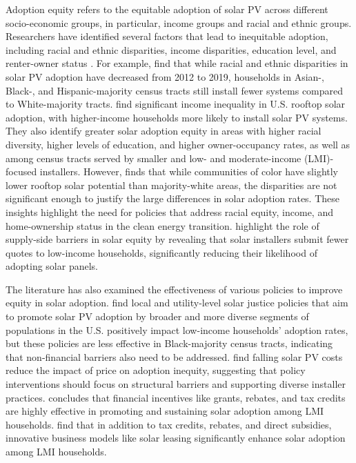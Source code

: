 \documentclass[12pt,twoside,letterpaper]{article}
\begin{document}
 Adoption equity refers to the equitable adoption of solar PV across different socio-economic groups, in particular, income groups and racial and ethnic groups. Researchers have identified several factors that lead to inequitable adoption, including racial and ethnic disparities, income disparities, education level, and renter-owner status \parencite{gao_solar_2022, darghouth_characterizing_2022, lukanov_distributed_2019, best_meta-analysis_2023}. For example, \textcite{gao_solar_2022} find that while racial and ethnic disparities in solar PV adoption have decreased from 2012 to 2019, households in Asian-, Black-, and Hispanic-majority census tracts still install fewer systems compared to White-majority tracts. \textcite{darghouth_characterizing_2022} find significant income inequality in U.S. rooftop solar adoption, with higher-income households more likely to install solar PV systems. They also identify greater solar adoption equity in areas with higher racial diversity, higher levels of education, and higher owner-occupancy rates, as well as among census tracts served by smaller and low- and moderate-income (LMI)-focused installers. However, \textcite{reames_exploring_2021} finds that while communities of color have slightly lower rooftop solar potential than majority-white areas, the disparities are not significant enough to justify the large differences in solar adoption rates. These insights highlight the need for policies that address racial equity, income, and home-ownership status in the clean energy transition. \textcite{oshaughnessy_income-targeted_2021}  highlight the role of supply-side barriers in solar equity by revealing that solar installers submit fewer quotes to low-income households, significantly reducing their likelihood of adopting solar panels.

 The literature has also examined the effectiveness of various policies to improve equity in solar adoption. \textcite{gao_solar_2022} find local and utility-level solar justice policies that aim to promote solar PV adoption by broader and more diverse segments of populations in the U.S. positively impact low-income households’ adoption rates, but these policies are less effective in Black-majority census tracts, indicating that non-financial barriers also need to be addressed. \textcite{darghouth_characterizing_2022} find falling solar PV costs reduce the impact of price on adoption inequity, suggesting that policy interventions should focus on structural barriers and supporting diverse installer practices. \textcite{oshaughnessy_rooftop_2022} concludes that financial incentives like grants, rebates, and tax credits are highly effective in promoting and sustaining solar adoption among LMI households. \textcite{oshaughnessy_impact_2021} find that in addition to tax credits, rebates, and direct subsidies, innovative business models like solar leasing significantly enhance solar adoption among LMI households. 
\end{document}

